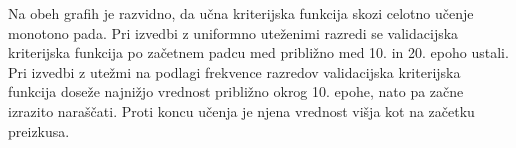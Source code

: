 \documentclass[a4paper,twoside,openright,12pt,slovene]{book}
\begin{document}
            \FloatBarrier

            Na obeh grafih je razvidno, da učna kriterijska funkcija skozi
            celotno učenje monotono pada. Pri izvedbi z uniformno uteženimi
            razredi se validacijska kriterijska funkcija po začetnem padcu med
            približno med 10. in 20. epoho ustali. Pri izvedbi z utežmi na
            podlagi frekvence razredov validacijska kriterijska funkcija doseže
            najnižjo vrednost približno okrog 10. epohe, nato pa začne izrazito
            naraščati. Proti koncu učenja je njena vrednost višja kot na
            začetku preizkusa.

\end{document}
